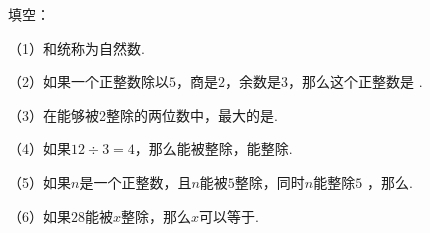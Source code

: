 填空：

（1）\key{\hspace{4em}}和\key{\hspace{4em}}统称为自然数.

（2）如果一个正整数除以$5$，商是$2$，余数是$3$，那么这个正整数是 \key{\hspace{4em}}.

（3）在能够被2整除的两位数中，最大的是\key{\hspace{4em}}.

（4）如果$12\div3=4$，那么\key{\hspace{4em}}能被\key{\hspace{4em}}整除，\key{\hspace{4em}}能整除\key{\hspace{4em}}.

（5）如果$n$是一个正整数，且$n$能被$5$整除，同时$n$能整除$5$ ，那么\key{\hspace{4em}}.

（6）如果$28$能被$x$整除，那么$x$可以等于\key{\hspace{4em}}.